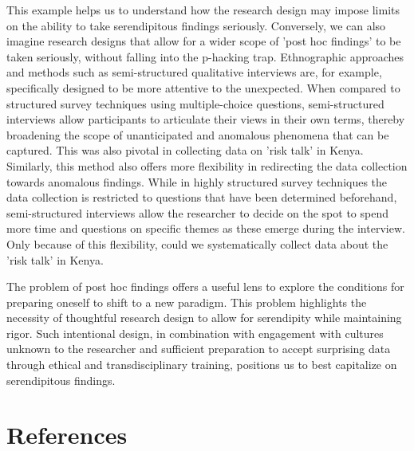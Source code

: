 \documentclass[authordate, empirical]{jote-new-article}
\begin{document}
	This example helps us to understand how the research design may impose limits on the ability to take serendipitous findings seriously. Conversely, we can also imagine research designs that allow for a wider scope of 'post hoc findings' to be taken seriously, without falling into the p-hacking trap. Ethnographic approaches and methods such as semi-structured qualitative interviews are, for example, specifically designed to be more attentive to the unexpected. When compared to structured survey techniques using multiple-choice questions, semi-structured interviews allow participants to articulate their views in their own terms, thereby broadening the scope of unanticipated and anomalous phenomena that can be captured. This was also pivotal in collecting data on 'risk talk' in Kenya. Similarly, this method also offers more flexibility in redirecting the data collection towards anomalous findings. While in highly structured survey techniques the data collection is restricted to questions that have been determined beforehand, semi-structured interviews allow the researcher to decide on the spot to spend more time and questions on specific themes as these emerge during the interview. Only because of this flexibility, could we systematically collect data about the 'risk talk' in Kenya.


	The problem of post hoc findings offers a useful lens to explore the conditions for preparing oneself to shift to a new paradigm. This problem highlights the necessity of thoughtful research design to allow for serendipity while maintaining rigor. Such intentional design, in combination with engagement with cultures unknown to the researcher and sufficient preparation to accept surprising data through ethical and transdisciplinary training, positions us to best capitalize on serendipitous findings.






	\section{References}
\end{document}
